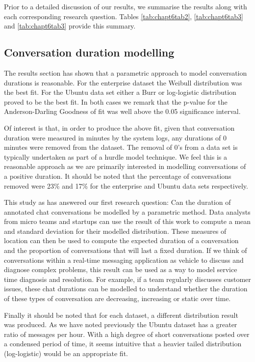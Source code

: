 Prior to a detailed discussion of our results, we summarise the results along with each corresponding research question. Tables \ref{tab:chapt6tab2}, \ref{tab:chapt6tab3} and \ref{tab:chapt6tab3} provide this summary.


\subsection{Conversation duration modelling}

The results section has shown that a parametric approach to model conversation durations is reasonable. For the enterprise dataset the Weibull distribution was the best fit. For the Ubuntu data set either a Burr or log-logistic distribution proved to be the best fit. In both cases we remark that the p-value for the Anderson-Darling Goodness of fit was well above the 0.05 significance interval. \par

Of interest is that, in order to produce the above fit, given that conversation duration were measured in minutes by the system logs, any durations of 0 minutes were removed from the dataset. The removal of 0's from a data set is typically undertaken as part of a hurdle model technique. We feel this is a reasonable approach as we are primarily interested in modelling conversations of a positive duration. It should be noted that the percentage of conversations removed were 23\% and 17\% for the enterprise and Ubuntu data sets respectively. \par

This study as has answered our first research question: Can the duration of annotated chat conversations be modelled by a parametric method. Data analysts from micro teams and startups can use the result of this work to compute a mean and standard deviation for their modelled distribution. These measures of location can then be used to compute the expected duration of a conversation and the proportion of conversations that will last a fixed duration. If we think of conversations within a real-time messaging application as vehicle to discuss and diagnose complex problems, this result can be used as a way to model service time diagnosis and resolution. For example, if a team regularly discusses customer issues, these chat durations can be modelled to understand whether the duration of these types of conversation are decreasing, increasing or static over time. \par

Finally it should be noted that for each dataset, a different distribution result was produced. As we have noted previously the Ubuntu dataset has a greater ratio of messages per hour. With a high degree of short conversations posted over a condensed period of time, it seems intuitive that a heavier tailed distribution (log-logistic) would be an appropriate fit. \par

